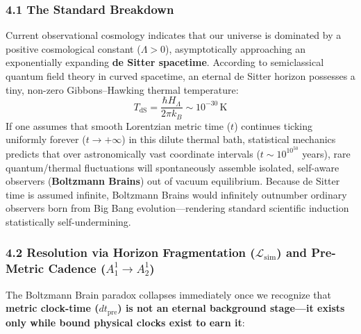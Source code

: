 \documentclass[
]{article}
\begin{document}
\subsubsection{4.1 The Standard
Breakdown}\label{the-standard-breakdown-2}

Current observational cosmology indicates that our universe is dominated
by a positive cosmological constant (\(\Lambda > 0\)), asymptotically
approaching an exponentially expanding \textbf{de Sitter spacetime}.
According to semiclassical quantum field theory in curved spacetime, an
eternal de Sitter horizon possesses a tiny, non-zero Gibbons--Hawking
thermal temperature:
\[T_{\mathrm{dS}} = \frac{\hbar H_\Lambda}{2\pi k_B} \sim 10^{-30}\,\text{K}\]
If one assumes that smooth Lorentzian metric time (\(t\)) continues
ticking uniformly forever (\(t \to +\infty\)) in this dilute thermal
bath, statistical mechanics predicts that over astronomically vast
coordinate intervals (\(t \sim 10^{10^{50}}\) years), rare
quantum/thermal fluctuations will spontaneously assemble isolated,
self-aware observers (\textbf{Boltzmann Brains}) out of vacuum
equilibrium. Because de Sitter time is assumed infinite, Boltzmann
Brains would infinitely outnumber ordinary observers born from Big Bang
evolution---rendering standard scientific induction statistically
self-undermining.

\subsubsection{\texorpdfstring{4.2 Resolution via Horizon Fragmentation
(\(\mathcal{L}_{\mathrm{sim}}\)) and Pre-Metric Cadence
(\(A_1^1 \to A_2^1\))}{4.2 Resolution via Horizon Fragmentation (\textbackslash mathcal\{L\}\_\{\textbackslash mathrm\{sim\}\}) and Pre-Metric Cadence (A\_1\^{}1 \textbackslash to A\_2\^{}1)}}\label{resolution-via-horizon-fragmentation-mathcall_mathrmsim-and-pre-metric-cadence-a_11-to-a_21}

The Boltzmann Brain paradox collapses immediately once we recognize that
\textbf{metric clock-time (\(dt_{\mathrm{pre}}\)) is not an eternal
background stage---it exists only while bound physical clocks exist to
earn it}:
\end{document}
